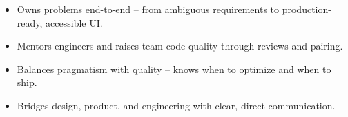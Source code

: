 %
%
%

{\begin{itemize}
    \item Owns problems end-to-end -- from ambiguous requirements to production-ready, accessible UI.
    \item Mentors engineers and raises team code quality through reviews and pairing.
    \item Balances pragmatism with quality -- knows when to optimize and when to ship.
    \item Bridges design, product, and engineering with clear, direct communication.
\end{itemize}}
